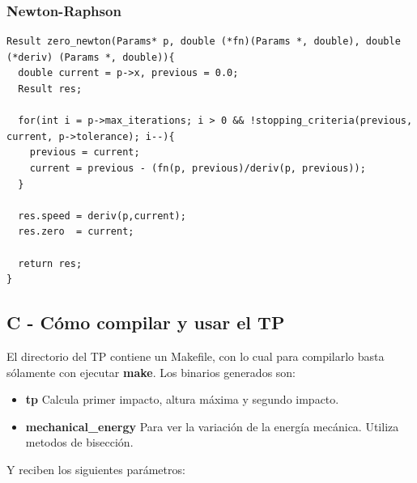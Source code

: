 \documentclass[a4paper]{article}
\begin{document}
\subsubsection{Newton-Raphson}
\begin{verbatim}
Result zero_newton(Params* p, double (*fn)(Params *, double), double (*deriv) (Params *, double)){
  double current = p->x, previous = 0.0;
  Result res;

  for(int i = p->max_iterations; i > 0 && !stopping_criteria(previous, current, p->tolerance); i--){
    previous = current;
    current = previous - (fn(p, previous)/deriv(p, previous));
  }

  res.speed = deriv(p,current);
  res.zero  = current;

  return res;
}
\end{verbatim}

\subsection{C - Cómo compilar y usar el TP}
El directorio del TP contiene un Makefile, con lo cual para compilarlo basta sólamente con ejecutar \textbf{make}. Los binarios generados son: 

\begin{itemize}
  \item \textbf{tp} Calcula primer impacto, altura máxima y segundo impacto.
  \item \textbf{mechanical\_energy} Para ver la variación de la energía mecánica. Utiliza metodos de bisección.
\end{itemize}

Y reciben los siguientes parámetros:
\end{document}
